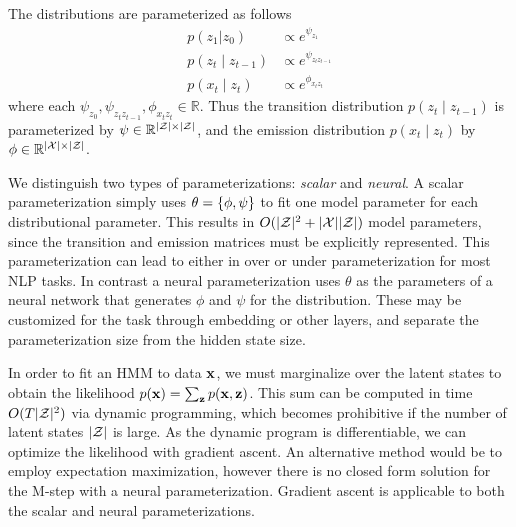\documentclass[11pt,a4paper]{article}
\begin{document}


\noindent The distributions are parameterized as follows
\begin{equation}
\label{param}
\begin{aligned}
p(z_1 | z_0) &\propto e^{\psi_{z_1}}\\
p(z_t \mid z_{t-1}) &\propto e^{\psi_{z_tz_{t-1}}}\\
p(x_t \mid z_t) &\propto e^{\phi_{x_tz_t}}
\end{aligned}
\end{equation}
where each $\psi_{z_0},\psi_{z_tz_{t-1}},\phi_{x_tz_t} \in \mathbb{R}$.
Thus the transition distribution $p(z_t \mid z_{t-1})$ is parameterized by
$\psi \in \mathbb{R}^{|\mathcal{Z}|\times|\mathcal{Z}|}$,
and the emission distribution $p(x_t \mid z_{t})$ by $\phi \in \mathbb{R}^{|\mathcal{X}| \times |\mathcal{Z}|}$.

We distinguish two types of parameterizations: \textit{scalar} and \textit{neural}.
A scalar parameterization simply uses $\theta = \left\{\phi,\psi\right\}$ to fit one model parameter for
each distributional parameter.
This results in $O(|\mathcal{Z}|^2 + |\mathcal{X}||\mathcal{Z}|)$ model parameters,
since the transition and emission matrices must be explicitly represented.
This parameterization can lead to either in over or under parameterization for most NLP tasks.
In contrast a neural parameterization uses $\theta$ as the parameters of a neural network
that generates $\phi$ and $\psi$ for the distribution.
These may be customized for the task through embedding or other layers,
and separate the parameterization size from the hidden state size. 

In order to fit an HMM to data $\mathbf{x}$,
we must marginalize over the latent states to obtain the likelihood
$p(\mathbf{x}) = \sum_{\mathbf{z}}p(\mathbf{x},\mathbf{z})$.
This sum can be computed in time $O(T|\mathcal{Z}|^2)$ via dynamic programming,
which becomes prohibitive if the number of latent states $|\mathcal{Z}|$ is large.
As the dynamic program is differentiable, we can optimize the likelihood 
with gradient ascent.
An alternative method would be to employ expectation maximization,
however there is no closed form solution for the M-step with a neural parameterization.
Gradient ascent is applicable to both the scalar and neural parameterizations.
\end{document}
